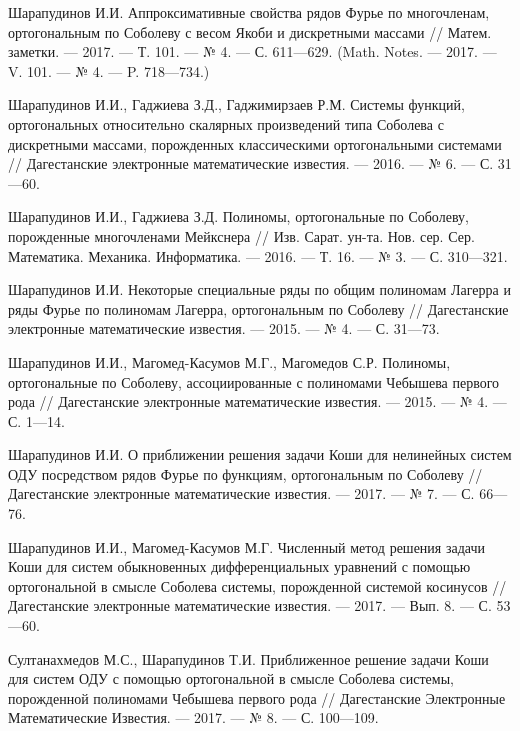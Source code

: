 \begin{thebibliography}{111}
Шарапудинов И.И. Аппроксимативные свойства рядов Фурье по многочленам, ортогональным по Соболеву с весом Якоби и дискретными массами // Матем. заметки. --- 2017. --- Т. 101. --- № 4. --- С. 611---629. (Math. Notes. --- 2017. --- V. 101. --- № 4. --- P. 718---734.)

Шарапудинов И.И., Гаджиева З.Д., Гаджимирзаев Р.М. Системы функций, ортогональных относительно скалярных произведений типа Соболева с дискретными массами, порожденных классическими ортогональными системами // Дагестанские электронные математические известия. --- 2016. --- № 6. --- С. 31---60.

Шарапудинов И.И., Гаджиева З.Д. Полиномы, ортогональные по Соболеву, порожденные многочленами Мейкснера // Изв. Сарат. ун-та. Нов. сер. Сер. Математика. Механика. Информатика. --- 2016. --- Т. 16. --- № 3. --- С. 310---321.

Шарапудинов И.И. Некоторые специальные ряды по общим полиномам Лагерра и ряды Фурье по полиномам Лагерра, ортогональным по Соболеву // Дагестанские электронные математические известия. --- 2015. --- № 4. --- С. 31---73.

Шарапудинов И.И., Магомед-Касумов М.Г., Магомедов С.Р. Полиномы, ортогональные по Соболеву, ассоциированные с полиномами Чебышева первого рода // Дагестанские электронные математические известия. --- 2015. --- № 4. --- С. 1---14.

Шарапудинов И.И. О приближении решения задачи Коши для нелинейных систем ОДУ посредством рядов Фурье по функциям, ортогональным по Соболеву // Дагестанские электронные математические известия. --- 2017. --- № 7. --- С. 66---76.

Шарапудинов И.И., Магомед-Касумов М.Г. Численный метод решения задачи Коши для систем обыкновенных дифференциальных уравнений с помощью ортогональной в смысле Соболева системы, порожденной системой косинусов // Дагестанские электронные математические известия. --- 2017. --- Вып. 8. --- С. 53---60.

Султанахмедов М.С., Шарапудинов Т.И. Приближенное решение задачи Коши для систем ОДУ с помощью ортогональной в смысле Соболева системы, порожденной полиномами Чебышева первого рода // Дагестанские Электронные Математические Известия. --- 2017. --- № 8. --- С. 100---109.


\end{thebibliography}
